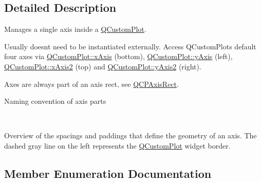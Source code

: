 \subsection{Detailed Description}
Manages a single axis inside a \hyperlink{class_q_custom_plot}{Q\+Custom\+Plot}. 

Usually doesn\textquotesingle{}t need to be instantiated externally. Access Q\+Custom\+Plot\textquotesingle{}s default four axes via \hyperlink{class_q_custom_plot_a9a79cd0158a4c7f30cbc702f0fd800e4}{Q\+Custom\+Plot\+::x\+Axis} (bottom), \hyperlink{class_q_custom_plot_af6fea5679725b152c14facd920b19367}{Q\+Custom\+Plot\+::y\+Axis} (left), \hyperlink{class_q_custom_plot_ada41599f22cad901c030f3dcbdd82fd9}{Q\+Custom\+Plot\+::x\+Axis2} (top) and \hyperlink{class_q_custom_plot_af13fdc5bce7d0fabd640f13ba805c0b7}{Q\+Custom\+Plot\+::y\+Axis2} (right).

Axes are always part of an axis rect, see \hyperlink{class_q_c_p_axis_rect}{Q\+C\+P\+Axis\+Rect}.  \begin{center}Naming convention of axis parts\end{center}  ~\newline
  \begin{center}Overview of the spacings and paddings that define the geometry of an axis. The dashed gray line on the left represents the \hyperlink{class_q_custom_plot}{Q\+Custom\+Plot} widget border.\end{center}  

\subsection{Member Enumeration Documentation}
\hypertarget{class_q_c_p_axis_ae2bcc1728b382f10f064612b368bc18a}{}
